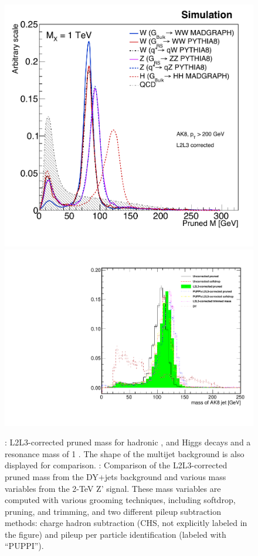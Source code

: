 \begin{figure}[!htb]
  \begin{center}
    \includegraphics[width=.495\textwidth]{figures/PrunedMass_1TeV.pdf}
    \includegraphics[width=.495\textwidth]{figures/mass2000_distribution.pdf}
  \end{center}
  \caption{\cmsLeft: L2L3-corrected pruned mass for hadronic \PW, \Z and Higgs decays and a resonance mass of 1 \TeV. The shape of the multijet background is also displayed for comparison. \cmsRight: Comparison of the L2L3-corrected pruned mass from the DY+jets 
  background and various mass variables from the 2-TeV Z' signal. These mass 
  variables are computed with various grooming techniques, including softdrop, 
  pruning, and trimming, and two different pileup subtraction methods: charge 
  hadron subtraction (CHS, not explicitly labeled in the figure) and pileup 
  per particle identification (labeled with ``PUPPI'').}  
  \label{fig:allmasses}
\end{figure}



